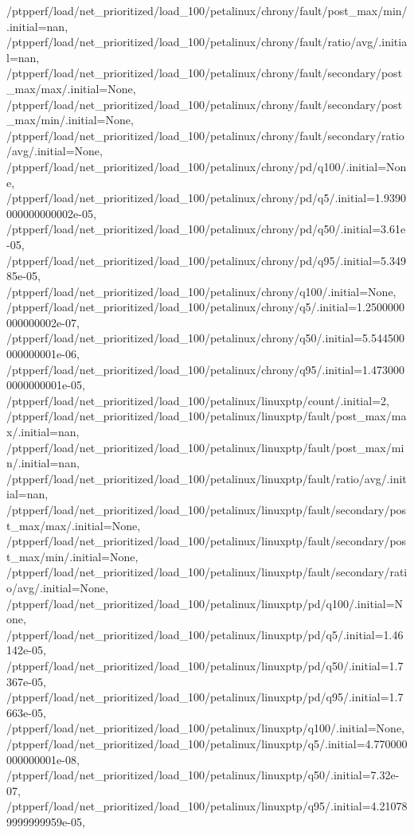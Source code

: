 {    /ptpperf/load/net_prioritized/load_100/petalinux/chrony/fault/post_max/min/.initial=nan,
    /ptpperf/load/net_prioritized/load_100/petalinux/chrony/fault/ratio/avg/.initial=nan,
    /ptpperf/load/net_prioritized/load_100/petalinux/chrony/fault/secondary/post_max/max/.initial=None,
    /ptpperf/load/net_prioritized/load_100/petalinux/chrony/fault/secondary/post_max/min/.initial=None,
    /ptpperf/load/net_prioritized/load_100/petalinux/chrony/fault/secondary/ratio/avg/.initial=None,
    /ptpperf/load/net_prioritized/load_100/petalinux/chrony/pd/q100/.initial=None,
    /ptpperf/load/net_prioritized/load_100/petalinux/chrony/pd/q5/.initial=1.9390000000000002e-05,
    /ptpperf/load/net_prioritized/load_100/petalinux/chrony/pd/q50/.initial=3.61e-05,
    /ptpperf/load/net_prioritized/load_100/petalinux/chrony/pd/q95/.initial=5.34985e-05,
    /ptpperf/load/net_prioritized/load_100/petalinux/chrony/q100/.initial=None,
    /ptpperf/load/net_prioritized/load_100/petalinux/chrony/q5/.initial=1.2500000000000002e-07,
    /ptpperf/load/net_prioritized/load_100/petalinux/chrony/q50/.initial=5.544500000000001e-06,
    /ptpperf/load/net_prioritized/load_100/petalinux/chrony/q95/.initial=1.4730000000000001e-05,
    /ptpperf/load/net_prioritized/load_100/petalinux/linuxptp/count/.initial=2,
    /ptpperf/load/net_prioritized/load_100/petalinux/linuxptp/fault/post_max/max/.initial=nan,
    /ptpperf/load/net_prioritized/load_100/petalinux/linuxptp/fault/post_max/min/.initial=nan,
    /ptpperf/load/net_prioritized/load_100/petalinux/linuxptp/fault/ratio/avg/.initial=nan,
    /ptpperf/load/net_prioritized/load_100/petalinux/linuxptp/fault/secondary/post_max/max/.initial=None,
    /ptpperf/load/net_prioritized/load_100/petalinux/linuxptp/fault/secondary/post_max/min/.initial=None,
    /ptpperf/load/net_prioritized/load_100/petalinux/linuxptp/fault/secondary/ratio/avg/.initial=None,
    /ptpperf/load/net_prioritized/load_100/petalinux/linuxptp/pd/q100/.initial=None,
    /ptpperf/load/net_prioritized/load_100/petalinux/linuxptp/pd/q5/.initial=1.46142e-05,
    /ptpperf/load/net_prioritized/load_100/petalinux/linuxptp/pd/q50/.initial=1.7367e-05,
    /ptpperf/load/net_prioritized/load_100/petalinux/linuxptp/pd/q95/.initial=1.7663e-05,
    /ptpperf/load/net_prioritized/load_100/petalinux/linuxptp/q100/.initial=None,
    /ptpperf/load/net_prioritized/load_100/petalinux/linuxptp/q5/.initial=4.770000000000001e-08,
    /ptpperf/load/net_prioritized/load_100/petalinux/linuxptp/q50/.initial=7.32e-07,
    /ptpperf/load/net_prioritized/load_100/petalinux/linuxptp/q95/.initial=4.210789999999959e-05,
}
